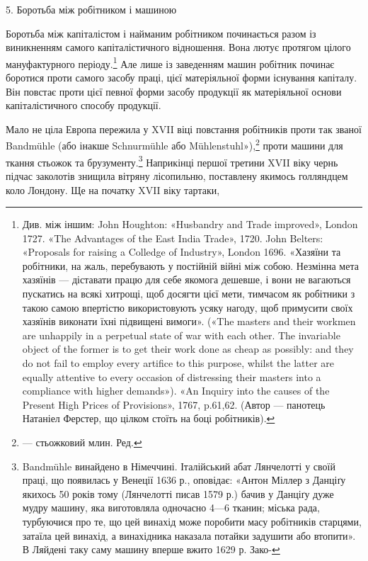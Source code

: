 5. Боротьба між робітником і машиною

Боротьба між капіталістом і найманим робітником починається
разом із виникненням самого капіталістичного відношення. Вона
лютує протягом цілого мануфактурного періоду.\footnote{
Див. між іншим: John Houghton: «Husbandry and Trade improved»,
London 1727. «The Advantages of the East India Trade», 1720.
John Belters: «Proposals for raising a Colledge of Industry», London
1696. «Хазяїни та робітники, на жаль, перебувають у постійній війні
між собою. Незмінна мета хазяїнів — діставати працю для себе якомога
дешевше, і вони не вагаються пускатись на всякі хитрощі, щоб досягти
цієї мети, тимчасом як робітники з такою самою впертістю використовують
усяку нагоду, щоб примусити своїх хазяїнів виконати їхні підвищені
вимоги». («The masters and their workmen are unhappily in a perpetual
state of war with each other. The invariable object of the former is to
get their work done as cheap as possibly: and they do not fail to employ
every artifice to this purpose, whilst the latter are equally attentive to
every occasion of distressing their masters into a compliance with higher
demands»). «An Inquiry into the causes of the Present High Prices of
Provisions», 1767, p.61,62. (Автор — панотець Натаніел Ферстер, що цілком
стоїть на боці робітників).
} Але лише
із заведенням машин робітник починає боротися проти самого
засобу праці, цієї матеріяльної форми існування капіталу. Він
повстає проти цієї певної форми засобу продукції як матеріяльної
основи капіталістичного способу продукції.

Мало не ціла Европа пережила у XVII віці повстання робітників
проти так званої Bandmühle (або інакше Schnurmühle
або Mühlenstuhl»),\footnote*{
— стьожковий млин. Ред.
} проти машини для ткання стьожок та брузументу.\footnote{
Bandmühle винайдено в Німеччині. Італійський абат Лянчелотті
у своїй праці, що появилась у Венеції 1636 р., оповідає: «Антон Міллер
з Данціґу якихось 50 років тому (Лянчелотті писав 1579 р.) бачив у Данціґу
дуже мудру машину, яка виготовляла одночасно 4—6 тканин; міська
рада, турбуючися про те, що цей винахід може поробити масу робітників
старцями, затаїла цей винахід, а винахідника наказала потайки задушити
або втопити». В Ляйдені таку саму машину вперше вжито 1629 р. Зако-
} Наприкінці першої третини XVII віку чернь підчас
заколотів знищила вітряну лісопильню, поставлену якимось голляндцем
коло Лондону. Ще на початку XVII віку тартаки,

